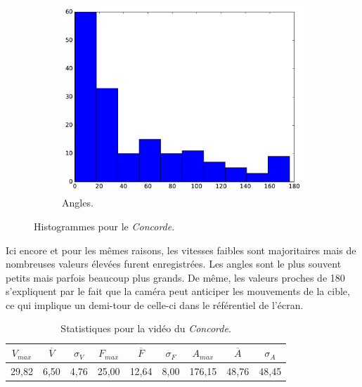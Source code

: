 \begin{figure}[!htbp]
\begin{subfigure}[t]{\subImgWclicks}
			\centering
			\includegraphics[width=\textwidth]{figures/ch3/concordeA_angle}
			\caption{Angles.}
			\label{fig:concordeA_angle}
		\end{subfigure}
		\caption[Histogrammes pour le \emph{Concorde}]{Histogrammes pour le \emph{Concorde}.}
		\label{fig:histConcorde}
	\end{figure}
	
	Ici encore et pour les mêmes raisons, les vitesses faibles sont majoritaires mais de nombreuses valeurs élevées furent enregistrées. Les angles sont le plus souvent petits mais parfois beaucoup plus grands. De même, les valeurs proches de 180\textdegree{} s'expliquent par le fait que la caméra peut anticiper les mouvements de la cible, ce qui implique un demi-tour de celle-ci dans le référentiel de l'écran.
	

\begin{table}
	\centering
	\begin{tabular}{c c c c c c c c c}
		$V_{max}$	& $\overline{V}$	& $\sigma_{V}$	& $F_{max}$	& $\overline{F}$	& $\sigma_{F}$	& $A_{max}$	& $\overline{A}$	& $\sigma_{A}$	\bigstrut[b] \\ \hline

		29,82		& 6,50				& 4,76			& 25,00		& 12,64				& 8,00			& 176,15	& 48,76				& 48,45			\bigstrut[t] \\
	\end{tabular}
	\caption[Statistiques pour la vidéo du \emph{Concorde}]{Statistiques pour la vidéo du \emph{Concorde}.}
	\label{tab:concordeA_stats}
\end{table}

